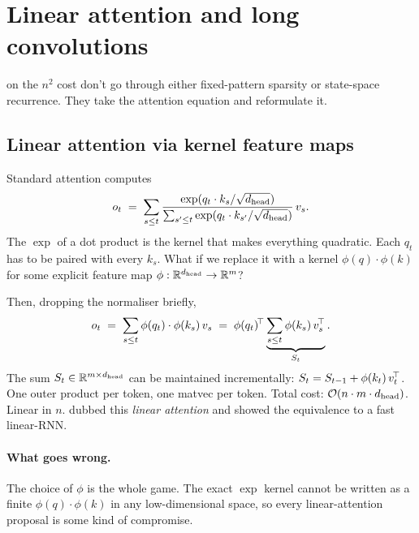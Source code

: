 \section{Linear attention and long convolutions}
\label{ch:linattn}

 on the \(n^2\) cost don't go through
either fixed-pattern sparsity or state-space recurrence. They take the
attention equation and reformulate it.

\subsection{Linear attention via kernel feature maps}

Standard attention computes
\begin{equation}
  o_t \;=\; \sum_{s \le t} \frac{\exp(q_t \cdot k_s / \sqrt{d_{\text{head}}})}
                                {\sum_{s' \le t} \exp(q_t \cdot k_{s'} / \sqrt{d_{\text{head}}})}\, v_s.
\end{equation}
The \(\exp\) of a dot product is the kernel that makes everything
quadratic. Each \(q_t\) has to be paired with every \(k_s\). What if we
replace it with a kernel \(\phi(q) \cdot \phi(k)\) for some explicit
feature map \(\phi : \mathbb{R}^{d_{\text{head}}} \to \mathbb{R}^{m}\)?

Then, dropping the normaliser briefly,
\begin{equation}
  o_t \;=\; \sum_{s \le t} \phi(q_t) \cdot \phi(k_s)\, v_s
        \;=\; \phi(q_t)^{\!\top} \underbrace{\sum_{s \le t} \phi(k_s)\, v_s^{\!\top}}_{S_t}.
\end{equation}
The sum \(S_t \in \mathbb{R}^{m \times d_{\text{head}}}\) can be maintained
incrementally: \(S_t = S_{t-1} + \phi(k_t)\, v_t^{\!\top}\). One outer product
per token, one matvec per token. Total cost: \(\mathcal{O}(n \cdot m \cdot
d_{\text{head}})\). Linear in \(n\). \citet{katharopoulos2020linear} dubbed this
\emph{linear attention} and showed the equivalence to a fast linear-RNN.

\paragraph{What goes wrong.} The choice of \(\phi\) is the whole game.
The exact \(\exp\) kernel cannot be written as a finite \(\phi(q) \cdot
\phi(k)\) in any low-dimensional space, so every linear-attention
proposal is some kind of compromise.

